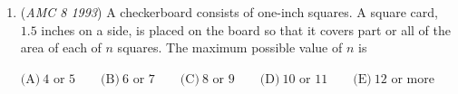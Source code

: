 \begin{enumerate}
 
 \[\begin{array}{cccccc}  & & & 1 & & \\ & & 2 & 3 & 4 & \\ & 5 & 6 & 7 & 8 & 9 \\ 10 & 11 & 12 & \cdots & & \\ \end{array}\]
$\text{(A)}\ 99 \qquad \text{(B)}\ 119 \qquad \text{(C)}\ 120 \qquad \text{(D)}\ 121 \qquad \text{(E)}\ 122$


	\item (\textit{AMC 8 1993}) A checkerboard consists of one-inch squares.  A square card, $1.5$ inches on a side, is placed on the board so that it covers part or all of the area of each of $n$ squares.  The maximum possible value of $n$ is


 $\text{(A)}\ 4\text{ or }5 \qquad \text{(B)}\ 6\text{ or }7\qquad \text{(C)}\ 8\text{ or }9 \qquad \text{(D)}\ 10\text{ or }11 \qquad \text{(E)}\ 12\text{ or more}$


\end{enumerate}